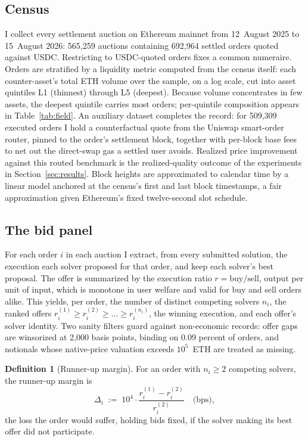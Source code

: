 \documentclass[11pt]{article}
\theoremstyle{plain}
\theoremstyle{definition}
\newtheorem{definition}{Definition}
\theoremstyle{remark}
\begin{document}
\subsection{Census}\label{sec:census}
I collect every settlement auction on Ethereum mainnet from 12~August 2025 to 15~August 2026: 565{,}259 auctions containing 692{,}964 settled orders quoted against USDC. Restricting to USDC-quoted orders fixes a common numeraire. Orders are stratified by a liquidity metric computed from the census itself: each counter-asset's total ETH volume over the sample, on a log scale, cut into asset quintiles L1 (thinnest) through L5 (deepest). Because volume concentrates in few assets, the deepest quintile carries most orders; per-quintile composition appears in Table~\ref{tab:field}. An auxiliary dataset completes the record: for 509{,}309 executed orders I hold a counterfactual quote from the Uniswap smart-order router, pinned to the order's settlement block, together with per-block base fees to net out the direct-swap gas a settled user avoids. Realized price improvement against this routed benchmark is the realized-quality outcome of the experiments in Section~\ref{sec:results}. Block heights are approximated to calendar time by a linear model anchored at the census's first and last block timestamps, a fair approximation given Ethereum's fixed twelve-second slot schedule.

\subsection{The bid panel}\label{sec:panel}
For each order $i$ in each auction I extract, from every submitted solution, the execution each solver proposed for that order, and keep each solver's best proposal. The offer is summarized by the execution ratio $r = \text{buy}/\text{sell}$, output per unit of input, which is monotone in user welfare and valid for buy and sell orders alike. This yields, per order, the number of distinct competing solvers $n_i$, the ranked offers $r_i^{(1)} \ge r_i^{(2)} \ge \dots \ge r_i^{(n_i)}$, the winning execution, and each offer's solver identity. Two sanity filters guard against non-economic records: offer gaps are winsorized at 2{,}000 basis points, binding on 0.09 percent of orders, and notionals whose native-price valuation exceeds $10^5$~ETH are treated as missing.

\begin{definition}[Runner-up margin]\label{def:gap}
For an order with $n_i \ge 2$ competing solvers, the runner-up margin is
\begin{equation}\label{eq:gap}
\Delta_i \;:=\; 10^4 \cdot \frac{r_i^{(1)} - r_i^{(2)}}{r_i^{(2)}} \quad \text{(bps)},
\end{equation}
the loss the order would suffer, holding bids fixed, if the solver making its best offer did not participate.
\end{definition}
\end{document}
